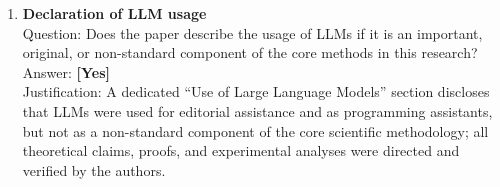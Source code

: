 \documentclass{article}
\begin{document}
\begin{enumerate}
\item {\bf Declaration of LLM usage}\\
Question: Does the paper describe the usage of LLMs if it is an important, original, or non-standard component of the core methods in this research?\\
Answer: \textbf{[Yes]}\\
Justification: A dedicated ``Use of Large Language Models'' section discloses that LLMs were used for editorial assistance and as programming assistants, but not as a non-standard component of the core scientific methodology; all theoretical claims, proofs, and experimental analyses were directed and verified by the authors.

\end{enumerate}
\end{document}
